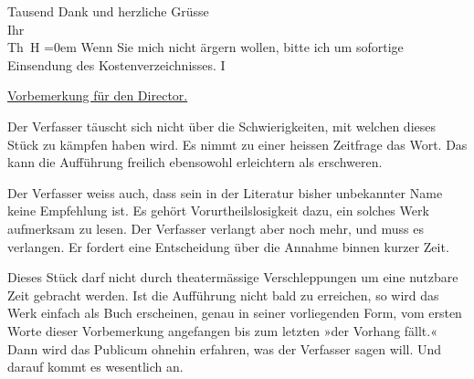 \pstart
           Tausend Dank und herzliche Grüsse {\\[\baselineskip]}Ihr{\\[\baselineskip]}\spacefill\mbox{Th H}\pend
           \leftskip=0em{}
\pstart
           \noindent{}Wenn Sie mich nicht ärgern wollen, bitte ich um sofortige Einsendung des
                  Kostenverzeichnisses.\pend
           \vspace{1em}
\pstart
           \noindent{}\centering{}{\pb}I\pend
           
\pstart
           \centering{}\uline{Vorbemerkung für den Director.}\pend
           
\pstart
           Der Verfasser täuscht sich nicht über die Schwierigkeiten, mit welchen dieses Stück zu kämpfen haben wird. Es
               nimmt zu einer heissen Zeitfrage das Wort. Das kann die Aufführung freilich
               ebensowohl erleichtern als erschweren.\pend
           
\pstart
           Der Verfasser weiss auch, dass sein in der Literatur bisher unbekannter Name keine
               Empfehlung ist. Es gehört Vorurtheilslosigkeit dazu, ein solches Werk aufmerksam zu lesen. Der Verfasser
               verlangt aber noch mehr, und muss es verlangen. Er fordert eine Entscheidung über die
               Annahme binnen kurzer Zeit.\pend
           
\pstart
           Dieses Stück darf nicht durch
               theatermässige Verschleppungen um eine nutzbare Zeit gebracht werden. Ist die
               Aufführung nicht bald zu erreichen, so wird das Werk einfach als Buch erscheinen, genau in seiner
               vorliegenden Form, vom ersten Worte dieser Vorbemerkung angefangen bis zum letzten
               »der Vorhang fällt.« Dann wird das Publicum ohnehin erfahren, was der Verfasser sagen
               will. Und darauf kommt es wesentlich an.\pend
           
